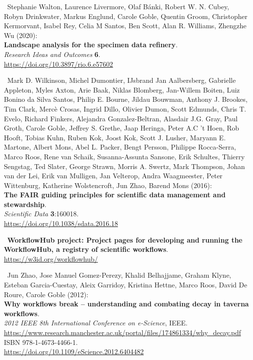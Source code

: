 \begin{thebibliography}{9}
~Stephanie Walton, Laurence Livermore, Olaf Bánki, Robert W. N.
Cubey, Robyn Drinkwater, Markus Englund, Carole Goble, Quentin Groom,
Christopher Kermorvant, Isabel Rey, Celia M Santos, Ben Scott, Alan R.
Williams, Zhengzhe Wu (2020):\\
\textbf{Landscape analysis for the specimen data refinery}.\\
\emph{Research Ideas and Outcomes} \textbf{6}.\\
\url{https://doi.org/10.3897/rio.6.e57602}

~Mark D. Wilkinson, Michel Dumontier, IJsbrand Jan Aalbersberg,
Gabrielle Appleton, Myles Axton, Arie Baak, Niklas Blomberg, Jan-Willem
Boiten, Luiz Bonino da Silva Santos, Philip E. Bourne, Jildau Bouwman,
Anthony J. Brookes, Tim Clark, Mercè Crosas, Ingrid Dillo, Olivier
Dumon, Scott Edmunds, Chris T. Evelo, Richard Finkers, Alejandra
Gonzalez-Beltran, Alasdair J.G. Gray, Paul Groth, Carole Goble, Jeffrey
S. Grethe, Jaap Heringa, Peter A.C 't Hoen, Rob Hooft, Tobias Kuhn,
Ruben Kok, Joost Kok, Scott J. Lusher, Maryann E. Martone, Albert Mons,
Abel L. Packer, Bengt Persson, Philippe Rocca-Serra, Marco Roos, Rene
van Schaik, Susanna-Assunta Sansone, Erik Schultes, Thierry Sengstag,
Ted Slater, George Strawn, Morris A. Swertz, Mark Thompson, Johan van
der Lei, Erik van Mulligen, Jan Velterop, Andra Waagmeester, Peter
Wittenburg, Katherine Wolstencroft, Jun Zhao, Barend Mons (2016):\\
\textbf{The FAIR guiding principles for scientific data management and
stewardship}.\\
\emph{Scientific Data} \textbf{3}:160018.\\
\url{https://doi.org/10.1038/sdata.2016.18}

~\textbf{WorkflowHub project: Project pages for developing and
running the WorkflowHub, a registry of scientific workflows}.\\
\url{https://w3id.org/workflowhub/}

~Jun Zhao, Jose Manuel Gomez-Perezy, Khalid Belhajjame, Graham
Klyne, Esteban Garcia-Cuestay, Aleix Garridoy, Kristina Hettne, Marco
Roos, David De Roure, Carole Goble (2012):\\
\textbf{Why workflows break -- understanding and combating decay in
taverna workflows}.\\
\emph{2012 IEEE 8th International Conference on e-Science}, IEEE.
\url{https://www.research.manchester.ac.uk/portal/files/174861334/why_decay.pdf}
ISBN 978-1-4673-4466-1.\\
\url{https://doi.org/10.1109/eScience.2012.6404482}


\end{thebibliography}
